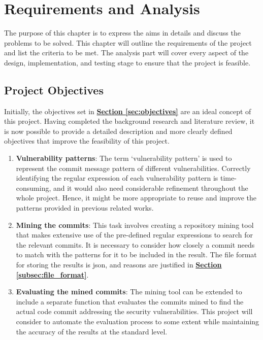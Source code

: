 \documentclass[12pt, a4paper]{report}
\begin{document}
\chapter{Requirements and Analysis}
The purpose of this chapter is to express the aims in details and discuss the problems to be solved.
This chapter will outline the requirements of the project and list the criteria to be met. The
analysis part will cover every aspect of the design, implementation, and testing stage to ensure
that the project is feasible.

\section{Project Objectives}
Initially, the objectives set in \hyperref[sec:objectives]{\textbf{Section \ref*{sec:objectives}}}
are an ideal concept of this project. Having completed the background research and literature
review, it is now possible to provide a detailed description and more clearly defined objectives
that improve the feasibility of this project.

\begin{enumerate}
  \item \textbf{Vulnerability patterns}: The term `vulnerability pattern' is used to represent the
  commit message pattern of different vulnerabilities. Correctly identifying the regular expression
  of each vulnerability pattern is time-consuming, and it would also need considerable refinement
  throughout the whole project. Hence, it might be more appropriate to reuse and improve the
  patterns provided in previous related works.
  \item \textbf{Mining the commits}: This task involves creating a repository mining tool that makes
  extensive use of the pre-defined regular expressions to search for the relevant commits. It is
  necessary to consider how closely a commit needs to match with the patterns for it to be included
  in the result. The file format for storing the results is \acrshort{json}, and reasons are
  justified in \hyperref[subsec:file_format]{\textbf{Section \ref*{subsec:file_format}}}.
  \item \textbf{Evaluating the mined commits}: The mining tool can be extended to include a separate
  function that evaluates the commits mined to find the actual code commit addressing the security
  vulnerabilities. This project will consider to automate the evaluation process to some extent
  while maintaining the accuracy of the results at the standard level.
\end{enumerate}
\end{document}
